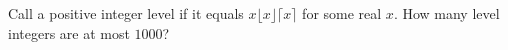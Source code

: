 Call a positive integer level if it equals $x\lfloor x\rfloor\lceil x\rceil$ for some real $x$. How many level integers are at most $1000$?
